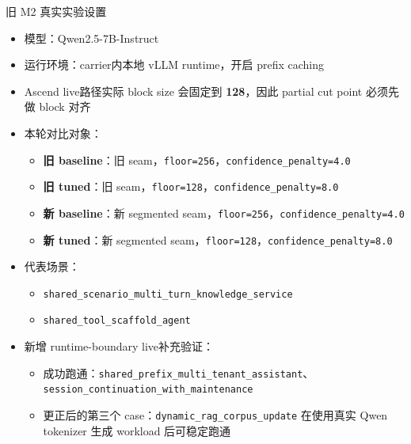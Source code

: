 \documentclass[aspectratio=169,UTF8,11pt]{ctexbeamer}
\begin{document}
\begin{frame}{旧 M2 真实实验设置}
  \begin{itemize}
    \item 模型：Qwen2.5-7B-Instruct
    \item 运行环境：carrier内本地 vLLM runtime，开启 prefix caching
    \item Ascend live路径实际 block size 会固定到 \textbf{128}，因此 partial cut point 必须先做 block 对齐
    \item 本轮对比对象：
    \begin{itemize}
      \item \textbf{旧 baseline}：旧 seam，\texttt{floor=256}，\texttt{confidence\_penalty=4.0}
      \item \textbf{旧 tuned}：旧 seam，\texttt{floor=128}，\texttt{confidence\_penalty=8.0}
      \item \textbf{新 baseline}：新 segmented seam，\texttt{floor=256}，\texttt{confidence\_penalty=4.0}
      \item \textbf{新 tuned}：新 segmented seam，\texttt{floor=128}，\texttt{confidence\_penalty=8.0}
    \end{itemize}
    \item 代表场景：
    \begin{itemize}
      \item \texttt{shared\_scenario\_multi\_turn\_knowledge\_service}
      \item \texttt{shared\_tool\_scaffold\_agent}
    \end{itemize}
    \item 新增 runtime-boundary live补充验证：
    \begin{itemize}
      \item 成功跑通：\texttt{shared\_prefix\_multi\_tenant\_assistant}、\texttt{session\_continuation\_with\_maintenance}
      \item 更正后的第三个 case：\texttt{dynamic\_rag\_corpus\_update} 在使用真实 Qwen tokenizer 生成 workload 后可稳定跑通
    \end{itemize}
  \end{itemize}
\end{frame}
\end{document}
